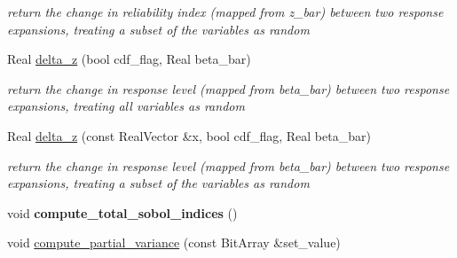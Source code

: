 \begin{DoxyCompactItemize}
\begin{DoxyCompactList}\small\item\em return the change in reliability index (mapped from z\+\_\+bar) between two response expansions, treating a subset of the variables as random \end{DoxyCompactList}\item 
Real \hyperlink{classPecos_1_1HierarchInterpPolyApproximation_a677b7ca69b5b17169b3f6e3ccb972ce6}{delta\+\_\+z} (bool cdf\+\_\+flag, Real beta\+\_\+bar)\label{classPecos_1_1HierarchInterpPolyApproximation_a677b7ca69b5b17169b3f6e3ccb972ce6}

\begin{DoxyCompactList}\small\item\em return the change in response level (mapped from beta\+\_\+bar) between two response expansions, treating all variables as random \end{DoxyCompactList}\item 
Real \hyperlink{classPecos_1_1HierarchInterpPolyApproximation_a3280b1f280ca2af6d965d5562fc42770}{delta\+\_\+z} (const Real\+Vector \&x, bool cdf\+\_\+flag, Real beta\+\_\+bar)\label{classPecos_1_1HierarchInterpPolyApproximation_a3280b1f280ca2af6d965d5562fc42770}

\begin{DoxyCompactList}\small\item\em return the change in response level (mapped from beta\+\_\+bar) between two response expansions, treating a subset of the variables as random \end{DoxyCompactList}\item 
void {\bfseries compute\+\_\+total\+\_\+sobol\+\_\+indices} ()\label{classPecos_1_1HierarchInterpPolyApproximation_a9b445d773d12ed85eb56bb73f6d7e540}

\item 
void \hyperlink{classPecos_1_1HierarchInterpPolyApproximation_a6eb2548a8c786f48478fabb6377be779}{compute\+\_\+partial\+\_\+variance} (const Bit\+Array \&set\+\_\+value)
\end{DoxyCompactItemize}
